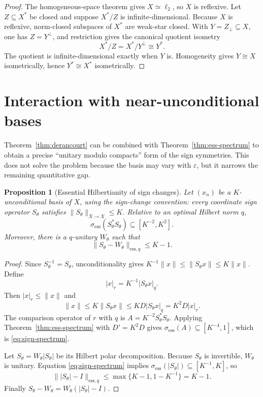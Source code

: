 \documentclass[11pt]{article}
\newtheorem{proposition}[theorem]{Proposition}
\theoremstyle{definition}
\begin{document}
\begin{proof}
The homogeneous-space theorem gives $X\simeq\ell_2$, so $X$ is reflexive.
Let $Z\subseteq X^*$ be closed and suppose $X^*/Z$ is infinite-dimensional.
Because $X$ is reflexive, norm-closed subspaces of $X^*$ are weak-star closed.
With $Y=Z_\perp\subseteq X$, one has $Z=Y^\perp$, and restriction gives the
canonical quotient isometry
\[
 X^*/Z=X^*/Y^\perp\cong Y^*.
\]
The quotient is infinite-dimensional exactly when $Y$ is.  Homogeneity gives
$Y\cong X$ isometrically, hence $Y^*\cong X^*$ isometrically.
\end{proof}

\section{Interaction with near-unconditional bases}\label{sec:unconditional}

Theorem~\ref{thm:derancourt} can be combined with
Theorem~\ref{thm:ess-spectrum} to obtain a precise ``unitary modulo compacts''
form of the sign symmetries.  This does not solve the problem because the basis
may vary with $\varepsilon$, but it narrows the remaining quantitative gap.

\begin{proposition}[Essential Hilbertianity of sign changes]
\label{prop:signs}
Let $(x_n)$ be a $K$-unconditional basis of $X$, using the sign-change
convention: every coordinate sign operator $S_\theta$ satisfies
$\|S_\theta\|_{X\to X}\leq K$.  Relative to an optimal Hilbert norm $q$,
\begin{equation}\label{eq:sign-spectrum}
 \sigma_{\mathrm{ess}}(S_\theta^*S_\theta)
 \subseteq[K^{-2},K^2].
\end{equation}
Moreover, there is a $q$-unitary $W_\theta$ such that
\begin{equation}\label{eq:essential-distance}
 \|S_\theta-W_\theta\|_{\mathrm{ess},q}\leq K-1.
\end{equation}
\end{proposition}

\begin{proof}
Since $S_\theta^{-1}=S_\theta$, unconditionality gives
$K^{-1}\|x\|\leq\|S_\theta x\|\leq K\|x\|$.  Define
\[
 |x|_r=K^{-1}|S_\theta x|_q.
\]
Then $|x|_r\leq\|x\|$ and
\[
 \|x\|\leq K\|S_\theta x\|
 \leq KD|S_\theta x|_q=K^2D|x|_r.
\]
The comparison operator of $r$ with $q$ is
$A=K^{-2}S_\theta^*S_\theta$.  Applying
Theorem~\ref{thm:ess-spectrum} with $D'=K^2D$ gives
$\sigma_{\mathrm{ess}}(A)\subseteq[K^{-4},1]$, which is
\eqref{eq:sign-spectrum}.

Let $S_\theta=W_\theta|S_\theta|$ be its Hilbert polar decomposition.  Because
$S_\theta$ is invertible, $W_\theta$ is unitary.  Equation
\eqref{eq:sign-spectrum} implies
$\sigma_{\mathrm{ess}}(|S_\theta|)\subseteq[K^{-1},K]$, so
\[
 \||S_\theta|-I\|_{\mathrm{ess},q}
 \leq\max\{K-1,1-K^{-1}\}=K-1.
\]
Finally $S_\theta-W_\theta=W_\theta(|S_\theta|-I)$.
\end{proof}
\end{document}
